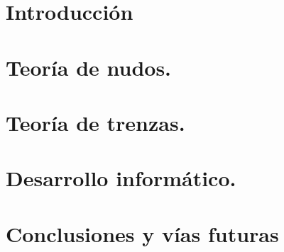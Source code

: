 \documentclass[a4paper,12pt]{book}
\begin{document}
\newtheorem{teo}{Teorema}[section]
\newtheorem{pro}{Proposición}[section]
\newtheorem{lem}{Lema}[section]
\newtheorem{cor}{Corolario}[section]
\newtheorem{alg}{Algoritmo}[section]


\frontmatter
{}


\tableofcontents
\listoffigures

\mainmatter
\chapter{Introducción}
\label{ch0}


\chapter{Teoría de nudos.}
\label{ch1}
\label{1sub1}
\label{1sub2}
\label{1sub3}
\label{1sub4}
\label{1sub5}
\label{1sub6}
\label{1sub7}

\chapter{Teoría de trenzas.}
\label{ch2}
\label{2sub1}

\label{2sub3a}
\label{2sub4}
\label{2sub5}

\chapter{Desarrollo informático.}
\label{ch3}





\chapter{Conclusiones y vías futuras}
\label{ch4}



\label{bibliog}
\end{document}
